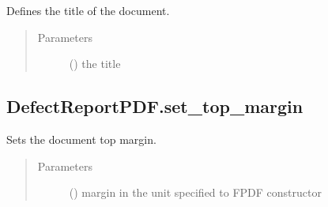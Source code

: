 \documentclass[letterpaper,10pt,english]{sphinxmanual}
\begin{document}
\begin{fulllineitems}
\begin{fulllineitems}
\label{\detokenize{generated/quality_assessment.quality_pdf_report.DefectReportPDF.set_title:quality_assessment.quality_pdf_report.DefectReportPDF.set_title}}
\sphinxAtStartPar
Defines the title of the document.
\begin{quote}\begin{description}
\item[{Parameters}] \leavevmode
\sphinxAtStartPar
{} () \textendash{} the title

\end{description}\end{quote}

\end{fulllineitems}



\subsection{DefectReportPDF.set\_top\_margin}
\label{\detokenize{generated/quality_assessment.quality_pdf_report.DefectReportPDF.set_top_margin:defectreportpdf-set-top-margin}}\label{\detokenize{generated/quality_assessment.quality_pdf_report.DefectReportPDF.set_top_margin::doc}}

\begin{fulllineitems}
\label{\detokenize{generated/quality_assessment.quality_pdf_report.DefectReportPDF.set_top_margin:quality_assessment.quality_pdf_report.DefectReportPDF.set_top_margin}}
\sphinxAtStartPar
Sets the document top margin.
\begin{quote}\begin{description}
\item[{Parameters}] \leavevmode
\sphinxAtStartPar
{} () \textendash{} margin in the unit specified to FPDF constructor


\end{description}
\end{quote}
\end{fulllineitems}
\end{fulllineitems}
\end{document}
